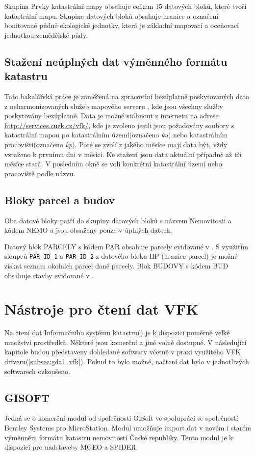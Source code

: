 Skupina Prvky katastrální mapy obsahuje celkem 15 datových bloků, které tvoří katastrální mapu. Skupina datových bloků  obsahuje hranice a označení bonitované půdně ekologické jednotky, která je základní mapovací a oceňovací jednotkou zemědělské půdy.
\subsection{Stažení neúplných dat výměnného formátu katastru}
Tato bakalářská práce je zaměřená na zpracování bezúplatně poskytovaných data z neharmonizovaných služeb mapového serveru , kde jsou všechny služby poskytovány bezúplatně. Data je možné stáhnout z internetu na adrese \href{http://services.cuzk.cz/vfk/}{http://services.cuzk.cz/vfk/}, kde je zvoleno jestli jsou požadovány soubory s katastrální mapou po katastrálním území(označeno \textit{ku}) nebo katastrálním pracovišti(označeno \textit{kp}). Poté se zvolí z jakého měsíce mají data být, vždy vztaženo k prvnímu dni v měsíci. Ke stažení jsou data aktuální případně až tři měsíce stará. V posledním okně se volí konkrétní katastrální území nebo pracoviště podle názvu.
\subsection{Bloky parcel a budov}
\label{subsec:bloky_par_bud}
Oba datové bloky patří do skupiny datových bloků s názvem Nemovitosti a kódem NEMO a jsou obsaženy pouze v úplných datech.

Datový blok PARCELY s kódem PAR obsahuje parcely evidované v . S využitím sloupců \verb|PAR_ID_1| a \verb|PAR_ID_2| z datového bloku HP (hranice parcel) je možné získat seznam okolních parcel dané parcely. Blok BUDOVY s kódem BUD obsahuje stavby evidované v .
 
\section{Nástroje pro čtení dat VFK} 
Na čtení dat Informačního systému katastru() je k dispozici poměrně velké množství prostředků. Některé jsou komerční a jiné volně dostupné. V následující kapitole budou představeny dohledané softwary včetně v praxi využitého VFK driveru(\ref{subsec:gdal_vfk}). Pokud to bylo možné, načtení dat bylo v jednotlivých softwarech ozkoušeno.
\subsection{GISOFT}
Jedná se o komerční modul od společnosti GISoft ve spolupráci se společností Bentley Systems pro MicroStation. Modul umožňuje import dat v novém i starém výměnném formátu katastru nemovitostí České republiky. Tento modul je k dispozici pro nadstaveby MGEO a SPIDER.\cite{gisoft}


